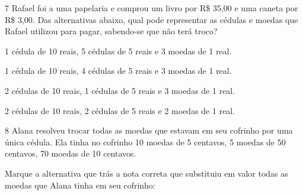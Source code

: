 \num{7} Rafael foi a uma papelaria e comprou um livro por R\$ 35,00 e uma
caneta por R\$ 3,00. Das alternativas abaixo, qual pode representar as
cédulas e moedas que Rafael utilizou para pagar, sabendo-se que não terá
troco?

\begin{minipage}{.5\textwidth}
\begin{escolha}
\item
  1 cédula de 10 reais, 5 cédulas de 5 reais e 3 moedas de 1 real.
\item
  1 cédula de 10 reais, 4 cédulas de 5 reais e 3 moedas de 1 real.
\item
  2 cédulas de 10 reais, 1 cédulas de 5 reais e 3 moedas de 1 real.
\item
  2 cédulas de 10 reais, 2 cédulas de 5 reais e 2 moedas de 1 real.
\end{escolha}
\end{minipage}

\num{8} Alana resolveu trocar todas as moedas que estavam em seu cofrinho
por uma única cédula. Ela tinha no cofrinho 10 moedas de 5 centavos, 5
moedas de 50 centavos, 70 moedas de 10 centavos.

Marque a alternativa que trás a nota correta que substituiu em valor
todas as moedas que Alana tinha em seu cofrinho:

